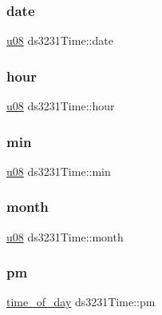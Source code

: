 \subsubsection{\texorpdfstring{date}{date}}
{\footnotesize\ttfamily \hyperlink{main_8h_ae2b6b8613a28b013c8c7fdaf93cdb1e1}{u08} ds3231\+Time\+::date}

\mbox{\label{structds3231Time_aa05da4e75303218734188aa8475fa629}} 
\subsubsection{\texorpdfstring{hour}{hour}}
{\footnotesize\ttfamily \hyperlink{main_8h_ae2b6b8613a28b013c8c7fdaf93cdb1e1}{u08} ds3231\+Time\+::hour}

\mbox{\label{structds3231Time_a3595434a68bda44d24bfa7a8c839418b}} 
\subsubsection{\texorpdfstring{min}{min}}
{\footnotesize\ttfamily \hyperlink{main_8h_ae2b6b8613a28b013c8c7fdaf93cdb1e1}{u08} ds3231\+Time\+::min}

\mbox{\label{structds3231Time_ae702f51286301b2fd9587815e4a0c987}} 
\subsubsection{\texorpdfstring{month}{month}}
{\footnotesize\ttfamily \hyperlink{main_8h_ae2b6b8613a28b013c8c7fdaf93cdb1e1}{u08} ds3231\+Time\+::month}

\mbox{\label{structds3231Time_ac7a03a1bcf075c4e07c74af0045cbca6}} 
\subsubsection{\texorpdfstring{pm}{pm}}
{\footnotesize\ttfamily \hyperlink{DS3231__stm32__hal_8h_ab6153795b3885e1d0215e3c26f302eea}{time\+\_\+of\+\_\+day} ds3231\+Time\+::pm}

